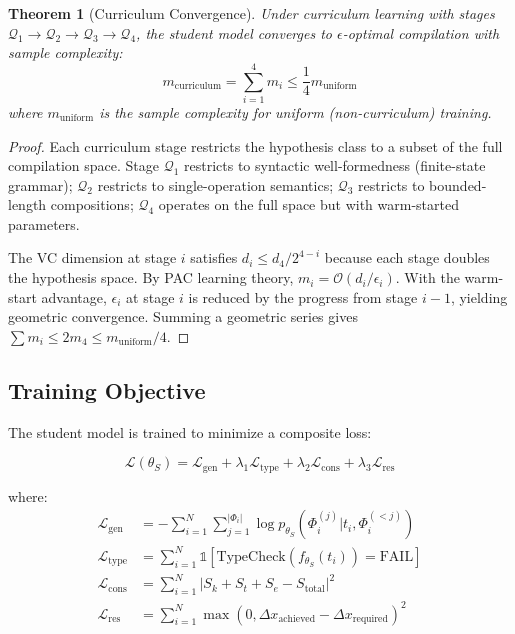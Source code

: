 \documentclass[11pt,twocolumn,a4paper]{article}
\newtheorem{theorem}{Theorem}[section]
\theoremstyle{definition}
\theoremstyle{remark}
\newcommand{\Sk}{S_k}
\newcommand{\St}{S_t}
\newcommand{\Se}{S_e}
\newcommand{\morphism}{\Phi}
\newcommand{\loss}{\mathcal{L}}
\newcommand{\params}{\theta}
\begin{document}
\begin{theorem}[Curriculum Convergence]
\label{thm:curriculum}
Under curriculum learning with stages $\mathcal{Q}_1 \to \mathcal{Q}_2 \to \mathcal{Q}_3 \to \mathcal{Q}_4$, the student model converges to $\epsilon$-optimal compilation with sample complexity:
\begin{equation}
m_{\text{curriculum}} = \sum_{i=1}^{4} m_i \leq \frac{1}{4} m_{\text{uniform}}
\end{equation}
where $m_{\text{uniform}}$ is the sample complexity for uniform (non-curriculum) training.
\end{theorem}

\begin{proof}
Each curriculum stage restricts the hypothesis class to a subset of the full compilation space. Stage $\mathcal{Q}_1$ restricts to syntactic well-formedness (finite-state grammar); $\mathcal{Q}_2$ restricts to single-operation semantics; $\mathcal{Q}_3$ restricts to bounded-length compositions; $\mathcal{Q}_4$ operates on the full space but with warm-started parameters.

The VC dimension at stage $i$ satisfies $d_i \leq d_4 / 2^{4-i}$ because each stage doubles the hypothesis space. By PAC learning theory, $m_i = \mathcal{O}(d_i / \epsilon_i)$. With the warm-start advantage, $\epsilon_i$ at stage $i$ is reduced by the progress from stage $i-1$, yielding geometric convergence. Summing a geometric series gives $\sum m_i \leq 2m_4 \leq m_{\text{uniform}} / 4$.
\end{proof}

\subsection{Training Objective}

The student model is trained to minimize a composite loss:

\begin{equation}
\loss(\params_S) = \loss_{\text{gen}} + \lambda_1 \loss_{\text{type}} + \lambda_2 \loss_{\text{cons}} + \lambda_3 \loss_{\text{res}}
\end{equation}

where:
\begin{align}
\loss_{\text{gen}} &= -\sum_{i=1}^{N} \sum_{j=1}^{|\morphism_i|} \log p_{\params_S}(\morphism_i^{(j)} | t_i, \morphism_i^{(<j)}) \label{eq:gen_loss} \\
\loss_{\text{type}} &= \sum_{i=1}^{N} \mathbb{1}[\text{TypeCheck}(f_{\params_S}(t_i)) = \text{FAIL}] \label{eq:type_loss} \\
\loss_{\text{cons}} &= \sum_{i=1}^{N} |\Sk + \St + \Se - S_{\text{total}}|^2 \label{eq:cons_loss} \\
\loss_{\text{res}} &= \sum_{i=1}^{N} \max(0, \Delta x_{\text{achieved}} - \Delta x_{\text{required}})^2 \label{eq:res_loss}
\end{align}
\end{document}
